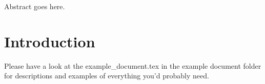 \documentclass[12pt]{article}
\begin{document}



 



Abstract goes here.
\clearpage



 
\clearpage



\tableofcontents
\listoffigures
\listoftables
\clearpage






\ESBprintglossary %
\clearpage






\ESBprintabbreviations %
\clearpage






\section{Introduction}
\label{sec:introduction}

Please have a look at the example\_document.tex in the example document folder for descriptions and examples of everything you'd probably need.
\end{document}
